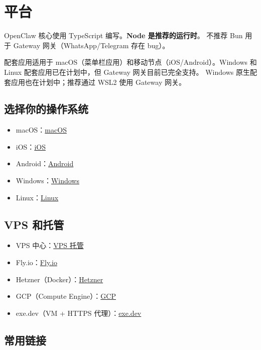 \clearpage

\section{平台}


OpenClaw 核心使用 TypeScript 编写。\textbf{Node 是推荐的运行时}。
不推荐 Bun 用于 Gateway 网关（WhatsApp/Telegram 存在 bug）。

配套应用适用于 macOS（菜单栏应用）和移动节点（iOS/Android）。Windows 和
Linux 配套应用已在计划中，但 Gateway 网关目前已完全支持。
Windows 原生配套应用也在计划中；推荐通过 WSL2 使用 Gateway 网关。

\subsection{选择你的操作系统}


\begin{itemize}
  \item macOS：\href{/platforms/macos}{macOS}
  \item iOS：\href{/platforms/ios}{iOS}
  \item Android：\href{/platforms/android}{Android}
  \item Windows：\href{/platforms/windows}{Windows}
  \item Linux：\href{/platforms/linux}{Linux}
\end{itemize}


\subsection{VPS 和托管}


\begin{itemize}
  \item VPS 中心：\href{/vps}{VPS 托管}
  \item Fly.io：\href{/install/fly}{Fly.io}
  \item Hetzner（Docker）：\href{/install/hetzner}{Hetzner}
  \item GCP（Compute Engine）：\href{/install/gcp}{GCP}
  \item exe.dev（VM + HTTPS 代理）：\href{/install/exe-dev}{exe.dev}
\end{itemize}


\subsection{常用链接}



